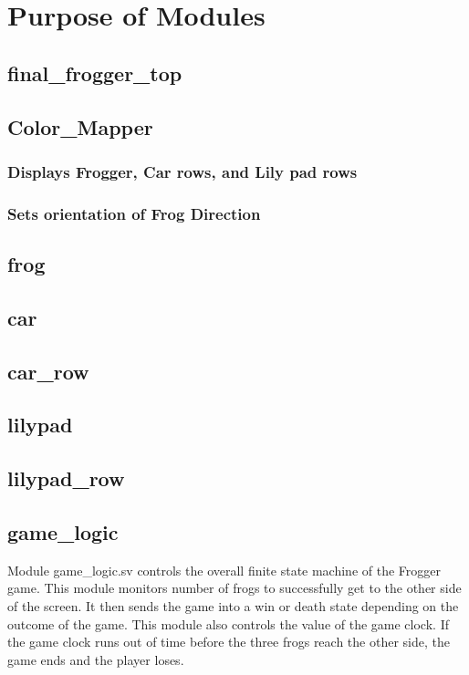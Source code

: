 \documentclass[journal, twocolumn, final,11pt,letterpaper]{IEEEtran}
\begin{document}
 
\section{Purpose of Modules}


	\subsection{final\_frogger\_top}
	\subsection{Color\_Mapper}
		\subsubsection{Displays Frogger, Car rows, and Lily pad rows }
		\subsubsection{Sets orientation of Frog Direction}
	\subsection{frog}
	\subsection{car}
	\subsection{car\_row}
	\subsection{lilypad}
	\subsection{lilypad\_row}
	\subsection{game\_logic}
	Module game\_logic.sv controls the overall finite state machine of the Frogger game.  This module monitors number of frogs to successfully get to the other side of the screen.  It then sends the game into a win or death state depending on the outcome of the game.  This module also controls the value of the game clock.  If the game clock runs out of time before the three frogs reach the other side, the game ends and the player loses. 
\end{document}
